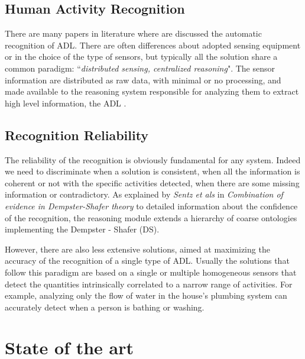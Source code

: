 \documentclass{thesisreport}
\begin{document}
\section{Human Activity Recognition}
There are many papers in literature where are discussed the automatic recognition of ADL. There are often differences about adopted sensing equipment or in the choice of the type of sensors, but typically all the solution share a common paradigm: ``\textit{distributed sensing, centralized reasoning}". The sensor information are distributed as raw data, with minimal or no processing, and made available to the reasoning system responsible for analyzing them to extract high level information, the ADL \cite{buoncompagni2017towards}.   


\section{Recognition Reliability} \label{reliability}
The reliability of the recognition is obviously fundamental for any system. Indeed we need to discriminate when a solution is consistent, when all the information is coherent or not with the specific activities detected, when there are some missing information or contradictory.
As explained by \textit{Sentz et als} in \textit{Combination of evidence in Dempster-Shafer theory} \cite{sentz2002combination} to detailed information about the confidence of the recognition, the reasoning module extends a hierarchy of coarse ontologies implementing the Dempster - Shafer (DS). 

However, there are also less extensive solutions, aimed at maximizing the accuracy of the recognition of a single type of ADL. Usually the solutions that follow this paradigm are based on a single or multiple homogeneous sensors that detect the quantities intrinsically correlated to a narrow range of activities. For example, analyzing only the flow of water in the house's plumbing system can accurately detect when a person is bathing or washing.

 \chapter{State of the art}
 
\end{document}
